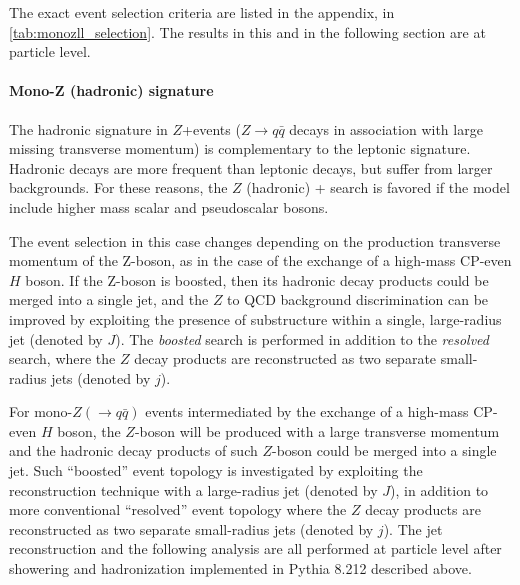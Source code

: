 The exact event selection criteria are listed in the appendix, in \autoref{tab:monozll_selection}. The results in this and in the following section are at particle level. 

\paragraph{Mono-Z (hadronic) signature}

The hadronic signature in $Z$+\MET events ($Z \to q\bar{q}$ decays in association with large missing transverse momentum) is complementary to the leptonic signature. 
Hadronic decays are more frequent than leptonic decays, but suffer from larger backgrounds. 
For these reasons, the $Z$ (hadronic) + \MET search is favored if the model include higher mass scalar and pseudoscalar bosons. 

The event selection in this case changes depending on the production transverse momentum of the Z-boson, as in the case of the exchange of a high-mass CP-even $H$ boson. 
If the Z-boson is boosted, then its hadronic decay products could be merged into a single jet, and the $Z$ to QCD background discrimination can be improved by exploiting the presence of substructure within a single, large-radius jet (denoted by $J$). 
The \textit{boosted} search is performed in addition to the \textit{resolved} search, where the $Z$ decay products are reconstructed as two separate small-radius jets (denoted by $j$).

For mono-$Z (\to q\bar{q})$ events intermediated by the exchange of a high-mass CP-even $H$ boson, the $Z$-boson will be produced with a large transverse momentum and the hadronic decay products of such $Z$-boson could be merged into a single jet. 
Such ``boosted'' event topology is investigated by exploiting the reconstruction technique with a large-radius jet (denoted by $J$), in addition to more conventional ``resolved'' event topology where the $Z$ decay products are reconstructed as two separate small-radius jets (denoted by $j$). 
The jet reconstruction and the following analysis are all performed at particle level after showering and hadronization implemented in Pythia 8.212 described above.

